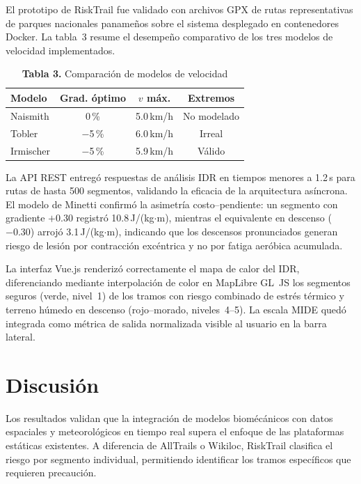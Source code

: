 \documentclass[10pt,letterpaper,twocolumn]{article}
\begin{document}
El prototipo de RiskTrail fue validado con archivos GPX de rutas
representativas de parques nacionales paname\~{n}os sobre el sistema
desplegado en contenedores Docker. La tabla~3 resume el desempe\~{n}o
comparativo de los tres modelos de velocidad implementados.

\begin{table}[H]
\centering
\caption{\textbf{Tabla 3.} Comparaci\'{o}n de modelos de velocidad}
\label{tab:modelos}
\begin{tabular}{@{}lccc@{}}
\toprule
\textbf{Modelo} & \textbf{Grad. \'{o}ptimo} & \textbf{$v$ m\'{a}x.} & \textbf{Extremos} \\
\midrule
Naismith  & 0\,\%    & 5.0\,km/h & No modelado \\
Tobler    & $-$5\,\% & 6.0\,km/h & Irreal \\
Irmischer & $-$5\,\% & 5.9\,km/h & V\'{a}lido \\
\bottomrule
\end{tabular}
\end{table}

La API REST entreg\'{o} respuestas de an\'{a}lisis IDR en tiempos menores
a 1.2\,s para rutas de hasta 500 segmentos, validando la eficacia de la
arquitectura as\'{i}ncrona. El modelo de Minetti confirm\'{o} la
asimetr\'{i}a costo--pendiente: un segmento con gradiente ${+}0.30$
registr\'{o} 10.8\,J/(kg$\cdot$m), mientras el equivalente en descenso
(${-}0.30$) arroj\'{o} 3.1\,J/(kg$\cdot$m), indicando que los descensos
pronunciados generan riesgo de lesi\'{o}n por contracci\'{o}n
exc\'{e}ntrica y no por fatiga aer\'{o}bica acumulada.

La interfaz Vue.js renderiz\'{o} correctamente el mapa de calor del IDR,
diferenciando mediante interpolaci\'{o}n de color en MapLibre GL~JS los
segmentos seguros (verde, nivel~1) de los tramos con riesgo combinado de
estr\'{e}s t\'{e}rmico y terreno h\'{u}medo en descenso (rojo--morado,
niveles~4--5). La escala MIDE qued\'{o} integrada como m\'{e}trica de
salida normalizada visible al usuario en la barra lateral.

\section{Discusi\'{o}n}

Los resultados validan que la integraci\'{o}n de modelos
biom\'{e}c\'{a}nicos con datos espaciales y meteorol\'{o}gicos en tiempo
real supera el enfoque de las plataformas est\'{a}ticas existentes.
A diferencia de AllTrails o Wikiloc, RiskTrail clasifica el riesgo por
segmento individual, permitiendo identificar los tramos espec\'{i}ficos
que requieren precauci\'{o}n.
\end{document}
